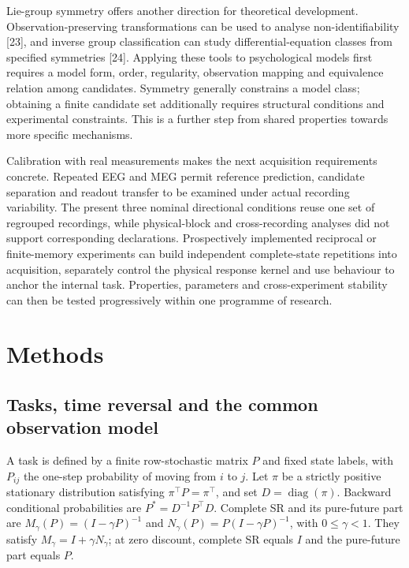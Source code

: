\documentclass[11pt,a4paper]{article}
\begin{document}
Lie-group symmetry offers another direction for theoretical development.
Observation-preserving transformations can be used to analyse
non-identifiability {[}23{]}, and inverse group classification can study
differential-equation classes from specified symmetries {[}24{]}.
Applying these tools to psychological models first requires a model
form, order, regularity, observation mapping and equivalence relation
among candidates. Symmetry generally constrains a model class; obtaining
a finite candidate set additionally requires structural conditions and
experimental constraints. This is a further step from shared properties
towards more specific mechanisms.

Calibration with real measurements makes the next acquisition
requirements concrete. Repeated EEG and MEG permit reference prediction,
candidate separation and readout transfer to be examined under actual
recording variability. The present three nominal directional conditions
reuse one set of regrouped recordings, while physical-block and
cross-recording analyses did not support corresponding declarations.
Prospectively implemented reciprocal or finite-memory experiments can
build independent complete-state repetitions into acquisition,
separately control the physical response kernel and use behaviour to
anchor the internal task. Properties, parameters and cross-experiment
stability can then be tested progressively within one programme of
research.

\FloatBarrier


\section{Methods}\label{methods}

\subsection{Tasks, time reversal and the common observation
model}\label{tasks-time-reversal-and-the-common-observation-model}

A task is defined by a finite row-stochastic matrix \(P\) and fixed
state labels, with \(P_{ij}\) the one-step probability of moving from
\(i\) to \(j\). Let \(\pi\) be a strictly positive stationary
distribution satisfying \(\pi^\top P=\pi^\top\), and set
\(D=\operatorname{diag}(\pi)\). Backward conditional probabilities are
\(P^*=D^{-1}P^\top D\). Complete SR and its pure-future part are
\(M_\gamma(P)=(I-\gamma P)^{-1}\) and
\(N_\gamma(P)=P(I-\gamma P)^{-1}\), with \(0\leq\gamma<1\). They satisfy
\(M_\gamma=I+\gamma N_\gamma\); at zero discount, complete SR equals
\(I\) and the pure-future part equals \(P\).
\end{document}
